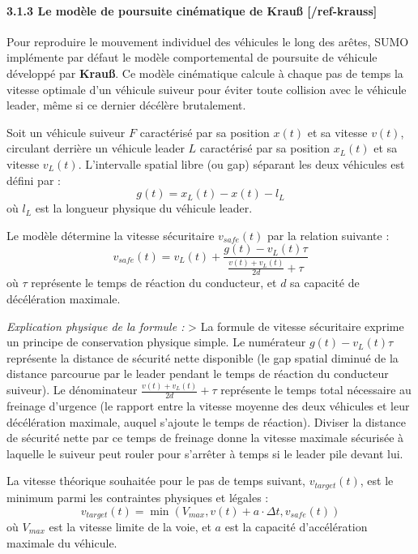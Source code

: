 \documentclass[10pt, a4paper]{article}
\begin{document}
\paragraph{3.1.3 Le modèle de poursuite cinématique de Krauß
{[}/ref-krauss{]}}\label{le-moduxe8le-de-poursuite-cinuxe9matique-de-krauuxdf-ref-krauss}

Pour reproduire le mouvement individuel des véhicules le long des
arêtes, SUMO implémente par défaut le modèle comportemental de poursuite
de véhicule développé par \textbf{Krauß}. Ce modèle cinématique calcule
à chaque pas de temps la vitesse optimale d'un véhicule suiveur pour
éviter toute collision avec le véhicule leader, même si ce dernier
décélère brutalement.

Soit un véhicule suiveur \(F\) caractérisé par sa position \(x(t)\) et
sa vitesse \(v(t)\), circulant derrière un véhicule leader \(L\)
caractérisé par sa position \(x_L(t)\) et sa vitesse \(v_L(t)\).
L'intervalle spatial libre (ou gap) séparant les deux véhicules est
défini par : \[g(t) = x_L(t) - x(t) - l_L\] où \(l_L\) est la longueur
physique du véhicule leader.

Le modèle détermine la vitesse sécuritaire \(v_{safe}(t)\) par la
relation suivante :
\[v_{safe}(t) = v_L(t) + \frac{g(t) - v_L(t)\tau}{\frac{v(t) + v_L(t)}{2d} + \tau}\]
où \(\tau\) représente le temps de réaction du conducteur, et \(d\) sa
capacité de décélération maximale.

\emph{Explication physique de la formule :} \textgreater{} La formule de
vitesse sécuritaire exprime un principe de conservation physique simple.
Le numérateur \(g(t) - v_L(t)\tau\) représente la distance de sécurité
nette disponible (le gap spatial diminué de la distance parcourue par le
leader pendant le temps de réaction du conducteur suiveur). Le
dénominateur \(\frac{v(t) + v_L(t)}{2d} + \tau\) représente le temps
total nécessaire au freinage d'urgence (le rapport entre la vitesse
moyenne des deux véhicules et leur décélération maximale, auquel
s'ajoute le temps de réaction). Diviser la distance de sécurité nette
par ce temps de freinage donne la vitesse maximale sécurisée à laquelle
le suiveur peut rouler pour s'arrêter à temps si le leader pile devant
lui.

La vitesse théorique souhaitée pour le pas de temps suivant,
\(v_{target}(t)\), est le minimum parmi les contraintes physiques et
légales :
\[v_{target}(t) = \min\left( V_{max}, v(t) + a \cdot \Delta t, v_{safe}(t) \right)\]
où \(V_{max}\) est la vitesse limite de la voie, et \(a\) est la
capacité d'accélération maximale du véhicule.
\end{document}
